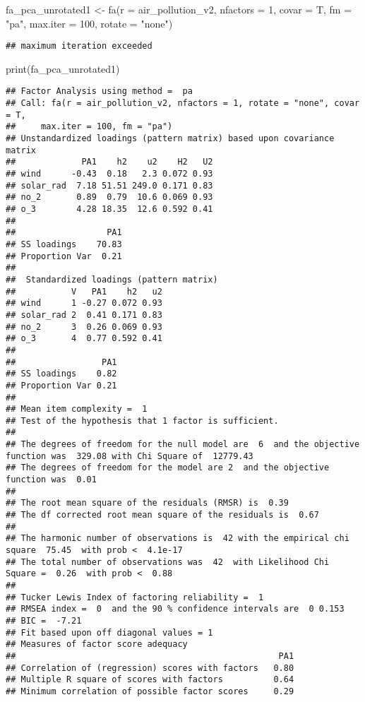 \documentclass[
]{article}
\newenvironment{Shaded}{\begin{snugshade}}{\end{snugshade}}
\newcommand{\AttributeTok}[1]{\textcolor[rgb]{0.77,0.63,0.00}{#1}}
\newcommand{\DecValTok}[1]{\textcolor[rgb]{0.00,0.00,0.81}{#1}}
\newcommand{\FunctionTok}[1]{\textcolor[rgb]{0.00,0.00,0.00}{#1}}
\newcommand{\NormalTok}[1]{#1}
\newcommand{\OtherTok}[1]{\textcolor[rgb]{0.56,0.35,0.01}{#1}}
\newcommand{\StringTok}[1]{\textcolor[rgb]{0.31,0.60,0.02}{#1}}
\begin{document}
\begin{Shaded}
\begin{Highlighting}[]
\NormalTok{fa\_pca\_unrotated1 }\OtherTok{\textless{}{-}} \FunctionTok{fa}\NormalTok{(}\AttributeTok{r =}\NormalTok{ air\_pollution\_v2, }\AttributeTok{nfactors =} \DecValTok{1}\NormalTok{, }\AttributeTok{covar =}\NormalTok{ T, }\AttributeTok{fm =} \StringTok{"pa"}\NormalTok{, }\AttributeTok{max.iter =} \DecValTok{100}\NormalTok{, }\AttributeTok{rotate =} \StringTok{"none"}\NormalTok{)}
\end{Highlighting}
\end{Shaded}

\begin{verbatim}
## maximum iteration exceeded
\end{verbatim}

\begin{Shaded}
\begin{Highlighting}[]
\FunctionTok{print}\NormalTok{(fa\_pca\_unrotated1)}
\end{Highlighting}
\end{Shaded}

\begin{verbatim}
## Factor Analysis using method =  pa
## Call: fa(r = air_pollution_v2, nfactors = 1, rotate = "none", covar = T, 
##     max.iter = 100, fm = "pa")
## Unstandardized loadings (pattern matrix) based upon covariance matrix
##             PA1    h2    u2    H2   U2
## wind      -0.43  0.18   2.3 0.072 0.93
## solar_rad  7.18 51.51 249.0 0.171 0.83
## no_2       0.89  0.79  10.6 0.069 0.93
## o_3        4.28 18.35  12.6 0.592 0.41
## 
##                  PA1
## SS loadings    70.83
## Proportion Var  0.21
## 
##  Standardized loadings (pattern matrix)
##           V   PA1    h2   u2
## wind      1 -0.27 0.072 0.93
## solar_rad 2  0.41 0.171 0.83
## no_2      3  0.26 0.069 0.93
## o_3       4  0.77 0.592 0.41
## 
##                 PA1
## SS loadings    0.82
## Proportion Var 0.21
## 
## Mean item complexity =  1
## Test of the hypothesis that 1 factor is sufficient.
## 
## The degrees of freedom for the null model are  6  and the objective function was  329.08 with Chi Square of  12779.43
## The degrees of freedom for the model are 2  and the objective function was  0.01 
## 
## The root mean square of the residuals (RMSR) is  0.39 
## The df corrected root mean square of the residuals is  0.67 
## 
## The harmonic number of observations is  42 with the empirical chi square  75.45  with prob <  4.1e-17 
## The total number of observations was  42  with Likelihood Chi Square =  0.26  with prob <  0.88 
## 
## Tucker Lewis Index of factoring reliability =  1
## RMSEA index =  0  and the 90 % confidence intervals are  0 0.153
## BIC =  -7.21
## Fit based upon off diagonal values = 1
## Measures of factor score adequacy             
##                                                    PA1
## Correlation of (regression) scores with factors   0.80
## Multiple R square of scores with factors          0.64
## Minimum correlation of possible factor scores     0.29
\end{verbatim}
\end{document}
